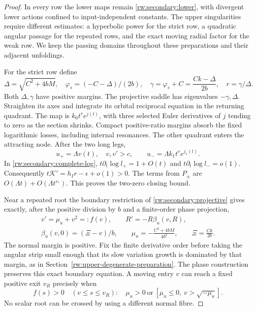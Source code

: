 \begin{proof}
In every row the lower maps remain \eqref{rw:secondary:lower}, with
divergent lower actions confined to input-independent constants.
The upper singularities require different estimates: a hyperbolic power
for the strict row, a quadratic angular passage for the repeated rows,
and the exact moving radial factor for the weak row. We keep the passing
domains throughout these preparations and their adjacent unfoldings.

For the strict row define
\[
 \Delta=\sqrt{C^2+4bM},\quad
 \varphi_s=(-C-\Delta)/(2b),\quad
 \gamma=\varphi_s+C=\frac{Ck-\Delta}{2b},\quad r=\gamma/\Delta.
\]
Both $\Delta,\gamma$ have positive margins.
The projective saddle has eigenvalues $-\gamma,\Delta$.
Straighten its axes and integrate its orbital reciprocal equation
in the returning quadrant. The map is $k_0t^re^{j(t)}$,
with three selected Euler derivatives of $j$ tending to zero
as the section shrinks. Compact positive-ratio margins absorb
the fixed logarithmic losses, including internal resonances.
The other quadrant enters the attracting node.
After the two long legs,
\[
 u_+=\Lambda v(t),\quad v,v'>c,\qquad
 u_-=\Lambda k_1t^re^{j_1(t)} .
\]
In \eqref{rw:secondary:complete-log},
$t\partial_t\log l_+=1+O(t)$ and
$t\partial_t\log l_-=o(1)$.
Consequently $t\mathcal K'=h_Ir-\epsilon+o(1)>0$.
The terms from $P_\pm$ are $O(\Lambda t)+O(\Lambda t^{r_*})$.
This proves the two-zero closing bound.

Near a repeated root the boundary restriction of
\eqref{rw:secondary:projective} gives exactly, after the positive
division by $b$ and a finite-order phase projection,
\begin{equation}\label{rw:secondary:repeated}
\begin{gathered}
 v'=\mu_u+v^2=:f(v),\qquad R'=-R\beta_u(v,R),\\
 \beta_u(v,0)=(\Xi-v)/b,\qquad
 \mu_u=-\frac{C^2+4bM}{4b^2},\qquad \Xi=\frac{Ck}{2b}.
\end{gathered}
\end{equation}
The normal margin is positive. Fix the finite derivative order
before taking the angular strip small enough that its slow variation
growth is dominated by that margin, as in
Section~\ref{rw:upper-degenerate-preparation}.
The phase construction preserves this exact boundary equation.
A moving entry $v$ can reach a fixed positive exit $v_R$ precisely when
\begin{equation}\label{rw:secondary:repeated-domain}
 f(s)>0\quad(v\le s\le v_R):
 \quad \mu_u>0\ \text{or}\ %
       [\mu_u\le0,\ v>\sqrt{-\mu_u}].
\end{equation}
No scalar root can be crossed by using a different normal fibre.


\end{proof}
